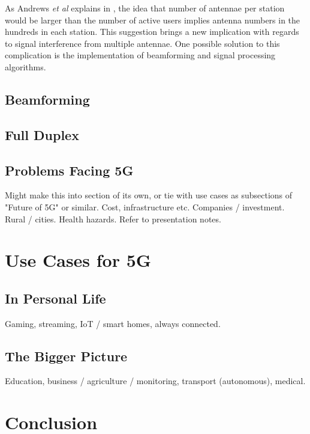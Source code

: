 \documentclass[journal]{IEEEtran}
\begin{document}
As Andrews \textit{et al} explains in \cite{whatwill5gbe}, the idea that number of antennae per station would be larger than the number of active users implies antenna numbers in the hundreds in each station. This suggestion brings a new implication with regards to signal interference from multiple antennae. One possible solution to this complication is the implementation of beamforming and signal processing algorithms.

\subsection{Beamforming}\label{subsec:beamf}
\subsection{Full Duplex}
\subsection{Problems Facing 5G}
Might make this into section of its own, or tie with use cases as subsections of "Future of 5G" or similar.
Cost, infrastructure etc. Companies / investment. Rural / cities. Health hazards. Refer to presentation notes.

\section{Use Cases for 5G}
\subsection{In Personal Life}
Gaming, streaming, IoT / smart homes, always connected.
\subsection{The Bigger Picture}
Education, business / agriculture / monitoring, transport (autonomous), medical.

\section{Conclusion}

\printbibliography
\end{document}

